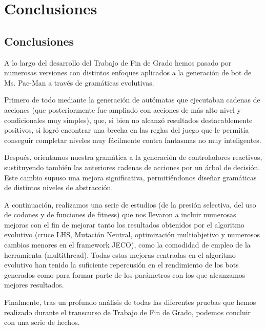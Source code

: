 \chapter{Conclusiones}

\section{Conclusiones}
A lo largo del desarrollo del Trabajo de Fin de Grado hemos pasado por numerosas versiones con distintos enfoques aplicados a la generación de bot de Ms. Pac-Man a través de gramáticas evolutivas. 
 
Primero de todo mediante la generación de autómatas que ejecutaban cadenas de acciones (que posteriormente fue ampliado con acciones de más alto nivel y condicionales muy simples), que, si bien no alcanzó resultados destacablemente positivos, si logró encontrar una brecha en las reglas del juego que le permitía conseguir completar niveles muy fácilmente contra fantasmas no muy inteligentes.
 
Después, orientamos nuestra gramática a la generación de controladores reactivos, sustituyendo también las anteriores cadenas de acciones por un árbol de decisión. Este cambio supuso una mejora significativa, permitiéndonos diseñar gramáticas de distintos niveles de abstracción.
 
A continuación, realizamos una serie de estudios (de la presión selectiva, del uso de codones y de funciones de fitness) que nos llevaron a incluir numerosas mejoras con el fin de mejorar tanto los resultados obtenidos por el algoritmo evolutivo (cruce LHS, Mutación Neutral, optimización multiobjetivo y numerosos cambios menores en el framework JECO), como la comodidad de empleo de la herramienta (multithread). Todas estas mejoras centradas en el algoritmo evolutivo han tenido la suficiente repercusión en el rendimiento de los bots generados como para formar parte de los parámetros con los que alcanzamos mejores resultados.
 
Finalmente, tras un profundo análisis de todas las diferentes pruebas que hemos realizado durante el transcurso de Trabajo de Fin de Grado, podemos concluir con una serie de hechos. 
 
